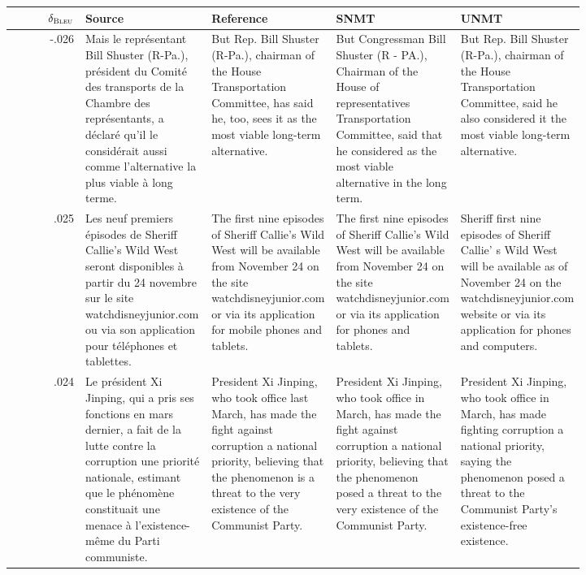 \begin{table}[ht]
\centering
\fontsize{7.55}{7.55}
\selectfont
\begin{tabular}{r @{\hspace{2mm}} p{0.22\linewidth}p{0.20\linewidth}p{0.20\linewidth}p{0.20\linewidth}}
 $\delta_{{\textsc{Bleu}}}$& Source & Reference & SNMT & UNMT \\\hline\hline
-.026 & Mais le représentant Bill Shuster (R-Pa.), président du Comité des transports de la Chambre des représentants, a déclaré qu'il le considérait aussi comme l'alternative la plus viable à long terme. & But Rep. Bill Shuster (R-Pa.), chairman of the House Transportation Committee, has said he, too, sees it as the most viable long-term alternative. & But Congressman Bill Shuster (R - PA.), Chairman of the House of representatives Transportation Committee, said that he considered as the most viable alternative in the long term. & But Rep. Bill Shuster (R-Pa.), chairman of the House Transportation Committee, said he also considered it the most viable long-term alternative. \\\hline
.025 & Les neuf premiers épisodes de Sheriff Callie's Wild West seront disponibles à partir du 24 novembre sur le site watchdisneyjunior.com ou via son application pour téléphones et tablettes. & The first nine episodes of Sheriff Callie's Wild West will be available from November 24 on the site watchdisneyjunior.com or via its application for mobile phones and tablets. & The first nine episodes of Sheriff Callie's Wild West will be available from November 24 on the site watchdisneyjunior.com or via its application for phones and tablets. & Sheriff first nine episodes of Sheriff Callie' s Wild West will be available as of November 24 on the watchdisneyjunior.com website or via its application for phones and computers. \\
.024 & Le président Xi Jinping, qui a pris ses fonctions en mars dernier, a fait de la lutte contre la corruption une priorité nationale, estimant que le phénomène constituait une menace à l'existence-même du Parti communiste. & President Xi Jinping, who took office last March, has made the fight against corruption a national priority, believing that the phenomenon is a threat to the very existence of the Communist Party. & President Xi Jinping, who took office in March, has made the fight against corruption a national priority, believing that the phenomenon posed a threat to the very existence of the Communist Party. & President Xi Jinping, who took office in March, has made fighting corruption a national priority, saying the phenomenon posed a threat to the Communist Party's existence-free existence. \\\hline

\end{tabular}
\end{table}
